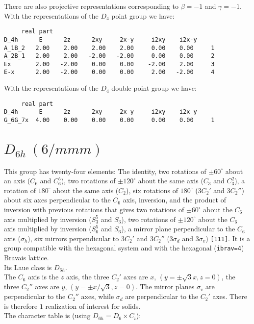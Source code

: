 \documentclass[12pt,a4paper,twoside]{report}
\begin{document}
There are also projective representations corresponding to $\beta=-1$ 
and $\gamma=-1$. With the representations of the $D_4$ point group we have:

\begin{tcolorbox}
\begin{footnotesize}
\begin{verbatim}
     real part
D_4h      E      2z      2xy     2x-y     i2xy    i2x-y
A_1B_2   2.00    2.00    2.00    2.00     0.00    0.00     1
A_2B_1   2.00    2.00   -2.00   -2.00     0.00    0.00     2
Ex       2.00   -2.00    0.00    0.00    -2.00    2.00     3
E-x      2.00   -2.00    0.00    0.00     2.00   -2.00     4
\end{verbatim}
\end{footnotesize}
\end{tcolorbox}

With the representations of the $D_4$ double point group we have:  

\begin{tcolorbox}
\begin{footnotesize}
\begin{verbatim}
     real part
D_4h      E      2z      2xy     2x-y     i2xy    i2x-y
G_6G_7x  4.00    0.00    0.00    0.00     0.00    0.00     1
\end{verbatim}
\end{footnotesize}
\end{tcolorbox}


\newpage
{\color{coral}\section{$D_{6h}\ (6/mmm)$}} 
\color{black}
This group has twenty-four elements: The identity, two rotations of 
$\pm60^\circ$ about an axis ($C_6$ and $C_6^5$), two rotations of 
$\pm120^\circ$ about the same axis ($C_3$ and $C_3^2$), a rotation of 
$180^\circ$ about the same axis ($C_2$), six rotations of $180^\circ$ 
($3C_2'$ and $3C_2''$) about six axes perpendicular to the $C_6$ axis,
inversion, and the product of inversion with previous rotations that gives
two rotations of $\pm60^\circ$ about the
$C_6$ axis multiplied by inversion ($S_3^5$ and $S_3$), two rotations of 
$\pm120^\circ$ about the $C_6$ axis multiplied by inversion 
($S_6^5$ and $S_6$), a mirror plane 
perpendicular to the $C_6$ axis ($\sigma_h$), six mirrors perpendicular 
to $3C_2'$ and $3C_2''$ ($3\sigma_d$ and $3\sigma_v$) \texttt{[111]}.
It is a group compatible with the hexagonal system
and with the hexagonal (\texttt{ibrav=4}) Bravais lattice. \\
Its Laue class is $D_{6h}$. \\
The $C_6$ axis is the $z$ axis, the three $C_2'$ axes are 
$x$, $(y=\pm\sqrt{3}x, z=0)$, the three $C_2''$ axes
are $y$, $(y=\pm x/\sqrt{3}, z=0)$. The mirror planes
$\sigma_v$ are perpendicular to the $C_2''$ axes, while $\sigma_d$ are
perpendicular to the $C_2'$ axes. There is therefore $1$ realization
of interest for solids. \\
The character table is (using $D_{6h}=D_6 \times C_i$):
\end{document}
